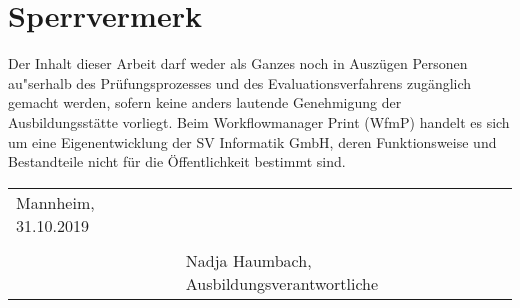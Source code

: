 \chapter*{Sperrvermerk}
Der Inhalt dieser Arbeit darf weder als Ganzes noch in Auszügen Personen au"serhalb des Prüfungsprozesses und des Evaluationsverfahrens zugänglich gemacht werden, sofern keine anders lautende Genehmigung der Ausbildungsstätte vorliegt. Beim Workflowmanager Print (WfmP) handelt es sich um eine Eigenentwicklung der SV Informatik GmbH, deren Funktionsweise und Bestandteile nicht für die Öffentlichkeit bestimmt sind.



\vspace{3cm}
\begingroup
\begin{table}[h!]
	\setlength\tabcolsep{0pt}
	\begin{tabular}{p{6.5cm}p{8.5cm}}
		Mannheim, 31.10.2019 &  \\
		& \\
		& Nadja Haumbach, Ausbildungsverantwortliche \\
	\end{tabular}
\end{table}
